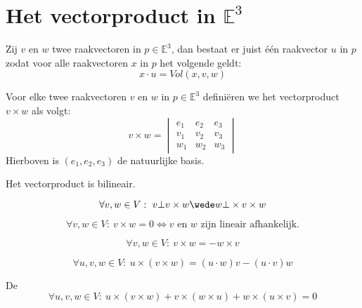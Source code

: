 \documentclass[main.tex]{subfiles}
\begin{document}
\chapter{Het vectorproduct in $\mathbb{E}^{3}$}
\label{cha:het-vect-mathbb}

\begin{lem}
  Zij $v$ en $w$ twee raakvectoren in $p\in \mathbb{E}^{3}$, dan bestaat er juist \'e\'en raakvector $u$ in $p$ zodat voor alle raakvectoren $x$ in $p$ het volgende geldt:
  \[ x \cdot u = Vol(x,v,w) \]
\end{lem}

\begin{de}
  Voor elke twee raakvectoren $v$ en $w$ in $p\in \mathbb{E}^{3}$ defini\"eren we het vectorproduct $v\times w$ als volgt:
  \[
  v \times w =
  \begin{vmatrix}
    e_{1} & e_{2} & e_{3}\\
    v_{1} & v_{2} & v_{3}\\
    w_{1} & w_{2} & w_{3}
  \end{vmatrix}
  \]
  Hierboven is $(e_{1},e_{2},e_{3})$ de natuurlijke basis.
\end{de}

\begin{st}
  Het vectorproduct is bilineair.
\end{st}

\begin{st}
  \[ \forall v,w \in V:\ v \bot v\times w \wede w \bot \times v\times w \]
\end{st}

\begin{st}
  \[ \forall v,w \in V:\ v\times w = 0 \Leftrightarrow v \text{ en } w \text{ zijn lineair afhankelijk.} \]
\end{st}

\begin{st}
  \[ \forall v,w \in V:\ v\times w = - w\times v \]
\end{st}

\begin{st}
  \[ \forall u,v,w \in V:\ u \times (v \times w) = (u \cdot w)v - (u \cdot v)w \]
\end{st}

\begin{st}
  De \\
  \[ \forall u,v,w \in V:\ u \times (v \times w) + v \times (w \times u) + w \times (u \times v) = 0 \]
\end{st}
\end{document}
